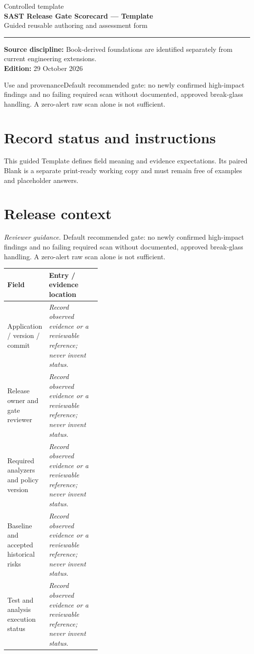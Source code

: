 \documentclass[10pt,letterpaper]{article}
\begin{document}
\hypersetup{pageanchor=false}%
\begin{titlepage}
\vspace*{1.0in}
{\color{bluegray}\Large Controlled template}\\[1.0em]
{\color{navy}\Huge\bfseries SAST Release Gate Scorecard --- Template}\\[0.7em]
{\Large Guided reusable authoring and assessment form}\\[2.0em]
\rule{\linewidth}{1.0pt}
\vfill
\textbf{Source discipline:} Book-derived foundations are identified separately from current engineering extensions.\\
\textbf{Edition:} 29 October 2026
\end{titlepage}\hypersetup{pageanchor=true}
\tableofcontents
\clearpage
\begin{focusbox}{Use and provenance}Default recommended gate: no newly confirmed high-impact findings and no failing required scan without documented, approved break-glass handling. A zero-alert raw scan alone is not sufficient.\end{focusbox}
\section{Record status and instructions}
This guided Template defines field meaning and evidence expectations. Its paired Blank is a separate print-ready working copy and must remain free of examples and placeholder answers.

\section{Release context}
\textit{Reviewer guidance.} Default recommended gate: no newly confirmed high-impact findings and no failing required scan without documented, approved break-glass handling. A zero-alert raw scan alone is not sufficient.
\begin{tabularx}{\linewidth}{@{}p{0.38\linewidth}Y@{}}
\toprule Field & Entry / evidence location\\\midrule
Application / version / commit & \textit{Record observed evidence or a reviewable reference; never invent status.}\\[1.0em]
\midrule
Release owner and gate reviewer & \textit{Record observed evidence or a reviewable reference; never invent status.}\\[1.0em]
\midrule
Required analyzers and policy version & \textit{Record observed evidence or a reviewable reference; never invent status.}\\[1.0em]
\midrule
Baseline and accepted historical risks & \textit{Record observed evidence or a reviewable reference; never invent status.}\\[1.0em]
\midrule
Test and analysis execution status & \textit{Record observed evidence or a reviewable reference; never invent status.}\\[1.0em]
\midrule
\end{tabularx}
\end{document}
